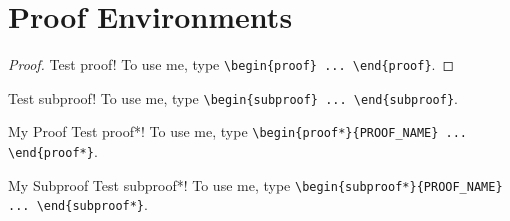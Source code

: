 \documentclass{scrartcl}
\begin{document}
\section{Proof Environments}
\begin{proof}
    Test proof! To use me, type \verb#\begin{proof} ... \end{proof}#.
\end{proof}
\begin{subproof}
    Test subproof! To use me, type \verb#\begin{subproof} ... \end{subproof}#.
\end{subproof}
\begin{proof*}{My Proof}
    Test proof*! To use me, type \verb#\begin{proof*}{PROOF_NAME} ... \end{proof*}#.
\end{proof*}
\begin{subproof*}{My Subproof}
    Test subproof*! To use me, type \verb#\begin{subproof*}{PROOF_NAME} ... \end{subproof*}#.
\end{subproof*}
\end{document}

